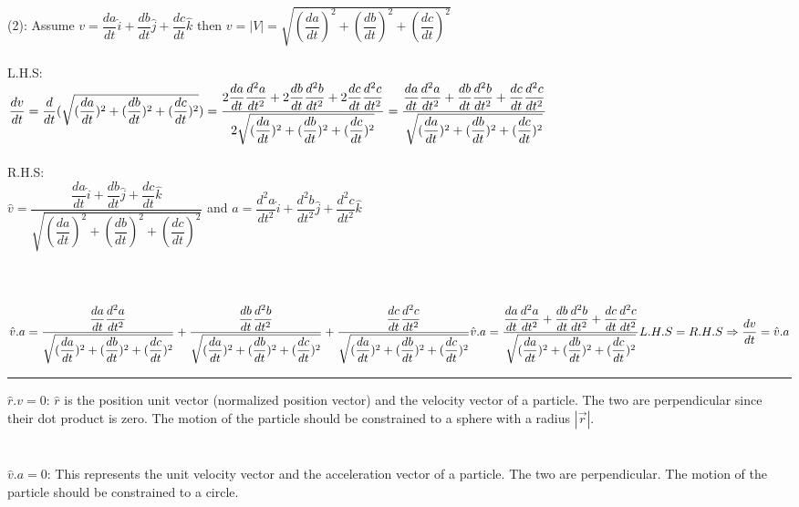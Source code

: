 \documentclass[fleqn]{article}
\begin{document}
\begin{enumerate}
      \textcolor{hwColor}{
        (2): Assume $v=\dfrac{da}{dt} \hat{i}+\dfrac{db}{dt} \hat{j}+\dfrac{dc}{dt} \hat{k}$ then $v=|V|=\sqrt{(\dfrac{da}{dt})^2+(\dfrac{db}{dt})^2+(\dfrac{dc}{dt})^2}$ \\
        \\
        L.H.S: \\
        $
          \dfrac{dv}{dt}=\dfrac{d}{dt}(\sqrt{(\dfrac{da}{dt})^2+(\dfrac{db}{dt})^2+(\dfrac{dc}{dt})^2})=\dfrac{2\dfrac{da}{dt}\dfrac{d^2a}{dt^2}+2\dfrac{db}{dt}\dfrac{d^2b}{dt^2}+2\dfrac{dc}{dt}\dfrac{d^2c}{dt^2}}{2\sqrt{(\dfrac{da}{dt})^2+(\dfrac{db}{dt})^2+(\dfrac{dc}{dt})^2}}=\dfrac{\dfrac{da}{dt}\dfrac{d^2a}{dt^2}+\dfrac{db}{dt}\dfrac{d^2b}{dt^2}+\dfrac{dc}{dt}\dfrac{d^2c}{dt^2}}{\sqrt{(\dfrac{da}{dt})^2+(\dfrac{db}{dt})^2+(\dfrac{dc}{dt})^2}} \\
        $
        \\
        \\
        R.H.S: \\
        $\hat{v}=\dfrac{\dfrac{da}{dt}\hat{i}+\dfrac{db}{dt}\hat{j}+\dfrac{dc}{dt}\hat{k}}{\sqrt{(\dfrac{da}{dt})^2+(\dfrac{db}{dt})^2+(\dfrac{dc}{dt})^2}}$ and $a=\dfrac{d^2a}{dt^2}\hat{i}+\dfrac{d^2b}{dt^2}\hat{j}+\dfrac{d^2c}{dt^2}\hat{k}$ \\
        \\
        \\
        \\
        $
          \hat{v}.a=\dfrac{\dfrac{da}{dt}\dfrac{d^2a}{dt^2}}{\sqrt{(\dfrac{da}{dt})^2+(\dfrac{db}{dt})^2+(\dfrac{dc}{dt})^2}}+\dfrac{\dfrac{db}{dt}\dfrac{d^2b}{dt^2}}{\sqrt{(\dfrac{da}{dt})^2+(\dfrac{db}{dt})^2+(\dfrac{dc}{dt})^2}}+\dfrac{\dfrac{dc}{dt}\dfrac{d^2c}{dt^2}}{\sqrt{(\dfrac{da}{dt})^2+(\dfrac{db}{dt})^2+(\dfrac{dc}{dt})^2}} \\
          \\
          \\
          \hat{v}.a=\dfrac{\dfrac{da}{dt}\dfrac{d^2a}{dt^2}+\dfrac{db}{dt}\dfrac{d^2b}{dt^2}+\dfrac{dc}{dt}\dfrac{d^2c}{dt^2}}{\sqrt{(\dfrac{da}{dt})^2+(\dfrac{db}{dt})^2+(\dfrac{dc}{dt})^2}} \\
          \\
          \\
          L.H.S=R.H.S \Rightarrow \dfrac{dv}{dt}=\hat{v}.a
        $
      }

      \textcolor{hwColor}{
        \rule{15cm}{1pt}
      }

      \textcolor{hwColor}{
        $\hat{r}.v=0$:  $\hat{r}$ is the position unit vector (normalized position vector) and the velocity vector of a particle.
        The two are perpendicular since their dot product is zero. The motion of the particle should be constrained to a sphere with a radius $|\overrightarrow{r}|$. \\
        \\
        \\
        $\hat{v}.a=0$: This represents the unit velocity vector and the acceleration vector of a particle. The two are perpendicular. The motion of the particle should be constrained to a circle.  
      }


\end{enumerate}
\end{document}
